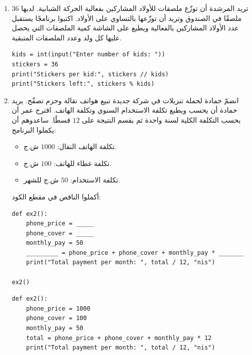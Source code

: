 \documentclass[14pt]{extarticle}
\begin{document}
\begin{enumerate}[resume, label=\textbf{تمرين \arabic*:}, wide=0pt, itemsep=2.2em]
\item تريد المرشدة أن توزّع ملصقات للأولاد المشاركين بفعالية الحركة الشبابية. لديها $36$ ملصقًا في الصندوق وتريد أن توزّعها بالتساوي على الأولاد.
اكتبوا برنامجًا يستقبل عدد الأولاد المشاركين بالفعالية ويطبع على الشاشة كمية الملصقات التي يحصل عليها كل ولد وعدد الملصقات المتبقية.

\ifwithsols
\begin{boxSolution}
\begin{english}
\begin{verbatim}
kids = int(input("Enter number of kids: "))
stickers = 36
print("Stickers per kid:", stickers // kids)
print("Stickers left:", stickers % kids)
\end{verbatim}
\end{english}
\end{boxSolution}
\fi
\filbreak

\item انضمّ حمادة لحملة تنزيلات في شركة جديدة تبيع هواتف نقالة وحزم تصفّح. يريد حمادة أن يحسب ويطبع تكلفة الاستخدام السنوي وتكلفة الهاتف. اقترح عمر أن يحسب التكلفة الكلية لسنة واحدة ثم يقسم النتيجة على $12$ قسطًا.
ساعدوهم أن يكملوا البرنامج:
\begin{itemize}
\item تكلفة الهاتف النقال: $1000$ ش.ج.
\item تكلفة غطاء للهاتف: $100$ ش.ج.
\item تكلفة الاستخدام: $50$ ش.ج للشهر.
\end{itemize}

أكملوا الناقص في مقطع الكود:
\begin{boxCode}
\begin{english}
\begin{verbatim}
def ex2():
    phone_price = _____
    phone_cover = _____
    monthly_pay = 50
    _________ = phone_price + phone_cover + monthly_pay * _______
    print("Total payment per month: ", total / 12, "nis")

ex2()
\end{verbatim}
\end{english}
\end{boxCode}

\ifwithsols
\begin{boxSolution}
\begin{english}
\begin{verbatim}
def ex2():
    phone_price = 1000
    phone_cover = 100
    monthly_pay = 50
    total = phone_price + phone_cover + monthly_pay * 12
    print("Total payment per month: ", total / 12, "nis")


\end{verbatim}
\end{english}
\end{boxSolution}
\end{enumerate}
\end{document}
